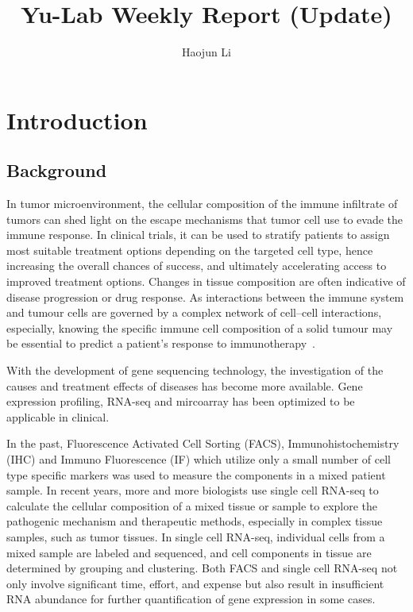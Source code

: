 \documentclass{article}
\title{Yu-Lab Weekly Report (Update)}
\begin{document}
\author{Haojun Li}
\maketitle

\section{Introduction}

\subsection{Background}
In tumor microenvironment, the cellular composition of the immune infiltrate of tumors can shed light on the escape mechanisms that tumor cell use to evade the immune response. In clinical trials, it can be used to stratify patients to assign most suitable treatment options depending on the targeted cell type, hence increasing the overall chances of success, and ultimately accelerating access to improved treatment options. Changes in tissue composition are often indicative of disease progression or drug response. As interactions between the immune system and tumour cells are governed by a complex network of cell–cell interactions, especially, knowing the specific immune cell composition of a solid tumour may be essential to predict a patient's response to immunotherapy~\cite{Schelker2017Estimation}. 

With the development of gene sequencing technology, the investigation of the causes and treatment effects of diseases has become more available. Gene expression profiling, RNA-seq and mircoarray has been optimized to be applicable in clinical.

In the past, Fluorescence Activated Cell Sorting (FACS), Immunohistochemistry (IHC) and Immuno Fluorescence (IF) which utilize only a small number of cell type specific markers was used to measure the components in a mixed patient sample. In recent years, more and more biologists use single cell RNA-seq to calculate the cellular composition of a mixed tissue or sample to explore the pathogenic mechanism and therapeutic methods, especially in complex tissue samples, such as tumor tissues. In single cell RNA-seq, individual cells from a mixed sample are labeled and sequenced, and cell components in tissue are determined by grouping and clustering. Both FACS and single cell RNA-seq not only involve significant time, effort, and expense but also result in insufficient RNA abundance for further quantification of gene expression in some cases.
\end{document}
